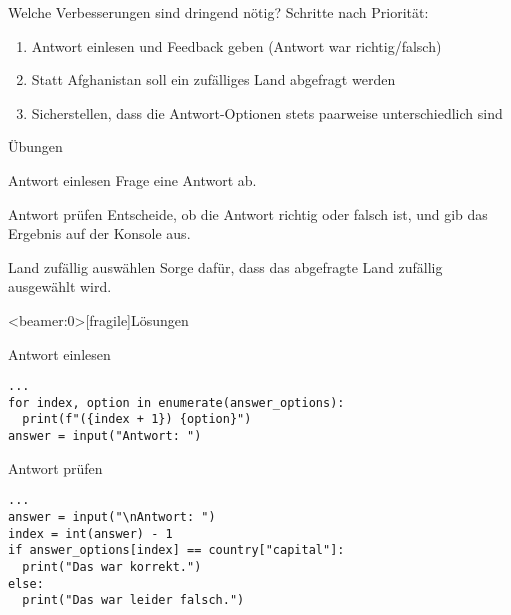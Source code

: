 \begin{frame}
\begin{block}{Welche Verbesserungen sind dringend nötig?}
	\vspace{2pt}
\pause 
Schritte nach Priorität: 
\pause 
	\begin{enumerate}[<+->]
		\item Antwort einlesen und Feedback geben (Antwort war richtig/falsch)
		\item Statt Afghanistan soll ein zufälliges Land abgefragt werden
		\item Sicherstellen, dass die Antwort-Optionen stets paarweise unterschiedlich sind
	\end{enumerate}	
\end{block}
\end{frame}


\begin{frame}{Übungen}
	
	\begin{block}{Antwort einlesen}
		\vspace{2pt}
		Frage eine Antwort ab. 	
	\end{block}
\vspace{12pt}
	
	\begin{block}{Antwort prüfen}
		\vspace{2pt}
		Entscheide, ob die Antwort richtig oder falsch ist, und gib das Ergebnis auf der Konsole aus. 
	\end{block}
\vspace{12pt}
	
	\begin{block}{Land zufällig auswählen}
		\vspace{2pt}
		Sorge dafür, dass das abgefragte Land zufällig ausgewählt wird. 
	\end{block}
	
	
\end{frame}

\begin{frame}<beamer:0>[fragile]{Lösungen}
	
\begin{solutionblock}{Antwort einlesen}
\begin{verbatim}
...
for index, option in enumerate(answer_options):
  print(f"({index + 1}) {option}")
answer = input("Antwort: ")
\end{verbatim}
\end{solutionblock}

\vspace{12pt}

\begin{solutionblock}{Antwort prüfen}
\begin{verbatim}
...
answer = input("\nAntwort: ")
index = int(answer) - 1
if answer_options[index] == country["capital"]:
  print("Das war korrekt.")
else:
  print("Das war leider falsch.")
\end{verbatim}
\end{solutionblock}


\end{frame}

